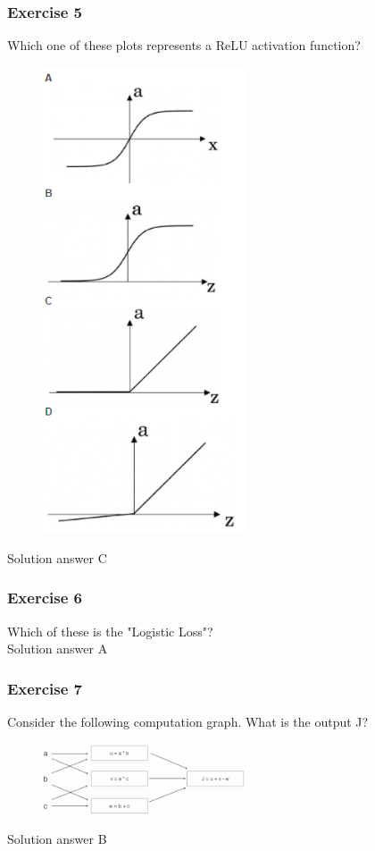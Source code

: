 \subsubsection*{Exercise 5}
Which one of these plots represents a ReLU activation function?
\begin{figure}[htbp]
    \centering
    \includegraphics[width=6cm]{ExerciseBook/01-NeuralNetwork/exercise5.png}\newline
\end{figure}
Solution answer C
\subsubsection*{Exercise 6}
Which of these is the "Logistic Loss"?\\
Solution answer A
\subsubsection*{Exercise 7}
Consider the following computation graph. What is the output J?
\begin{figure}[htbp]
    \centering
    \includegraphics[width=6cm]{ExerciseBook/01-NeuralNetwork/exercise7.png}\newline
\end{figure}
Solution answer B
